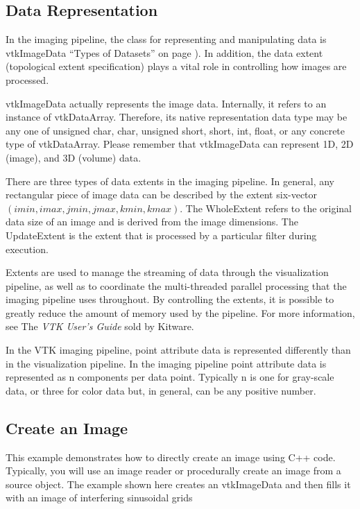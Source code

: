 \subsection{Data Representation}

In the imaging pipeline, the class for representing and manipulating data is vtkImageData ``Types of Datasets'' on page \pageref{sec:types_of_datasets}). In addition, the data extent (topological extent specification) plays a vital role in controlling how images are processed.

vtkImageData actually represents the image data. Internally, it refers to an instance of vtkDataArray. Therefore, its native representation data type may be any one of unsigned char, char, unsigned short, short, int, float, or any concrete type of vtkDataArray. Please remember that vtkImageData can represent 1D, 2D (image), and 3D (volume) data.

There are three types of data extents in the imaging pipeline. In general, any rectangular piece of image data can be described by the extent six-vector $(imin,imax, jmin,jmax, kmin,kmax)$. The WholeExtent refers to the original data size of an image and is derived from the image dimensions. The UpdateExtent is the extent that is processed by a particular filter during execution.

Extents are used to manage the streaming of data through the visualization pipeline, as well as to coordinate the multi-threaded parallel processing that the imaging pipeline uses throughout. By controlling the extents, it is possible to greatly reduce the amount of memory used by the pipeline. For more information, see The \emph{VTK User's Guide} sold by Kitware.

In the VTK imaging pipeline, point attribute data is represented differently than in the visualization pipeline. In the imaging pipeline point attribute data is represented as n components per data point. Typically n is one for gray-scale data, or three for color data but, in general, can be any positive number.

\subsection{Create an Image}

This example demonstrates how to directly create an image using C++ code. Typically, you will use an image reader or procedurally create an image from a source object. The example shown here creates an vtkImageData and then fills it with an image of interfering sinusoidal grids

